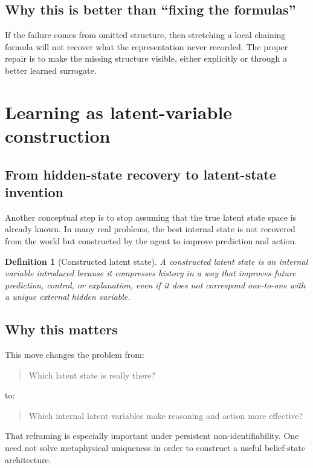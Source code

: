 \documentclass[11pt]{article}
\newtheorem{definition}{Definition}
\begin{document}
\subsection{Why this is better than ``fixing the formulas''}

If the failure comes from omitted structure, then stretching a local chaining
formula will not recover what the representation never recorded.  The proper
repair is to make the missing structure visible, either explicitly or through a
better learned surrogate.

\section{Learning as latent-variable construction}

\subsection{From hidden-state recovery to latent-state invention}

Another conceptual step is to stop assuming that the true latent state space is
already known.  In many real problems, the best internal state is not recovered
from the world but constructed by the agent to improve prediction and action.

\begin{definition}[Constructed latent state]
A constructed latent state is an internal variable introduced because it
compresses history in a way that improves future prediction, control, or
explanation, even if it does not correspond one-to-one with a unique external
hidden variable.
\end{definition}

\subsection{Why this matters}

This move changes the problem from:
\begin{quote}
Which latent state is really there?
\end{quote}
to:
\begin{quote}
Which internal latent variables make reasoning and action more effective?
\end{quote}

That reframing is especially important under persistent non-identifiability.
One need not solve metaphysical uniqueness in order to construct a useful
belief-state architecture.
\end{document}
